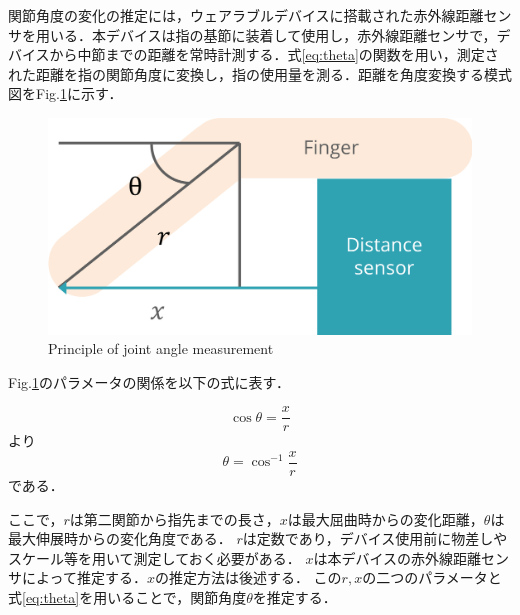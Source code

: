 関節角度の変化の推定には，ウェアラブルデバイスに搭載された赤外線距離センサを用いる．本デバイスは指の基節に装着して使用し，赤外線距離センサで，デバイスから中節までの距離を常時計測する．式\ref{eq:theta}の関数を用い，測定された距離を指の関節角度に変換し，指の使用量を測る．距離を角度変換する模式図をFig.\ref{fig:principle}に示す．

\begin{figure}[H]
  \centering
  \includegraphics[width=0.8\linewidth]{fig/principle}
  \caption{Principle of joint angle measurement}
  \label{fig:principle}
\end{figure}
Fig.\ref{fig:principle}のパラメータの関係を以下の式に表す．

\begin{equation}
\cos\theta = \frac{x}{r} 
\end{equation}
より
\begin{equation}
\theta = \cos^{-1} \frac{x}{r}
\label{eq:theta}
\end{equation}
である．

ここで，$r$は第二関節から指先までの長さ，$x$は最大屈曲時からの変化距離，$\theta$は最大伸展時からの変化角度である．
$r$は定数であり，デバイス使用前に物差しやスケール等を用いて測定しておく必要がある．
$x$は本デバイスの赤外線距離センサによって推定する．$x$の推定方法は後述する．
この$r,x$の二つのパラメータと式\ref{eq:theta}を用いることで，関節角度$\theta$を推定する．

